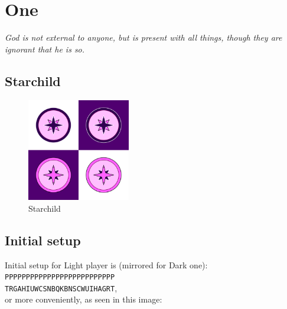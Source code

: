 \documentclass[a5paper,12pt,draft]{book} %
\begin{document}
\clearpage

\chapter*{One}

\begin{flushright}
\parbox{0.8\textwidth}{
\emph{God is not external to anyone, but is present with all things, though
they are ignorant that he is so. \\
 } }
\end{flushright}

\section*{Starchild}

\noindent
\begin{figure}
\includegraphics[width=0.4\textwidth, keepaspectratio=true]{../gfx/pieces/16_starchild.png}
\caption{Starchild}
\label{fig:starchild}
\end{figure}

\clearpage

\section*{Initial setup}

Initial setup for Light player is (mirrored for Dark one):
\texttt{PPPPPPPPPPPPPPPPPPPPPPPPPP \\
        TRGAHIUWCSNBQKBNSCWUIHAGRT}, \\
or more conveniently, as seen in this image:
\end{document}
